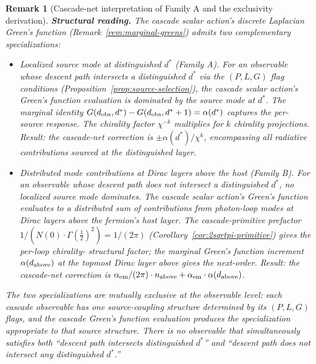 \documentclass[12pt,a4paper]{article}
\newtheorem*{remark}{Remark}
\begin{document}
\begin{remark}[Cascade-net interpretation of Family A and the exclusivity derivation]
\medskip\noindent\textbf{Structural reading.} The cascade scalar
action's discrete Laplacian Green's function (Remark~\ref{rem:marginal-greens})
admits two complementary specializations:
\begin{itemize}[nosep]
\item \emph{Localized source mode at distinguished $d^*$ (Family A).}
For an observable whose descent path intersects a distinguished
$d^*$ via the $(P, L, G)$ flag conditions
(Proposition~\ref{prop:source-selection}), the cascade scalar
action's Green's function evaluation is dominated by the source
mode at $d^*$. The marginal identity
$G(d_{\rm obs}, d^*) - G(d_{\rm obs}, d^*+1) = \alpha(d^*)$
captures the per-source response. The chirality factor $\chi^{-k}$
multiplies for $k$ chirality projections. Result: the cascade-net
correction is $\pm\alpha(d^*)/\chi^k$, encompassing all radiative
contributions sourced at the distinguished layer.
\item \emph{Distributed mode contributions at Dirac layers above
the host (Family B).} For an observable whose descent path does
not intersect a distinguished $d^*$, no localized source mode
dominates. The cascade scalar action's Green's function evaluates
to a distributed sum of contributions from photon-loop modes at
Dirac layers above the fermion's host layer. The cascade-primitive
prefactor $1/(N(0)\cdot\Gamma(\tfrac{1}{2})^2) = 1/(2\pi)$
(Corollary~\ref{cor:2sqrtpi-primitive}) gives the per-loop chirality-
structural factor; the marginal Green's function increment
$\alpha(d_{\rm above})$ at the topmost Dirac layer above gives the
next-order. Result: the cascade-net correction is
$\alpha_{\rm em}/(2\pi)\cdot n_{\rm above} +
\alpha_{\rm em}\cdot\alpha(d_{\rm above})$.
\end{itemize}

The two specializations are mutually exclusive at the observable
level: each cascade observable has \emph{one} source-coupling
structure determined by its $(P, L, G)$ flags, and the cascade
Green's function evaluation produces the specialization
appropriate to that source structure. There is no observable
that simultaneously satisfies both ``descent path intersects
distinguished $d^*$'' and ``descent path does not intersect any
distinguished $d^*$.''


\end{remark}
\end{document}
